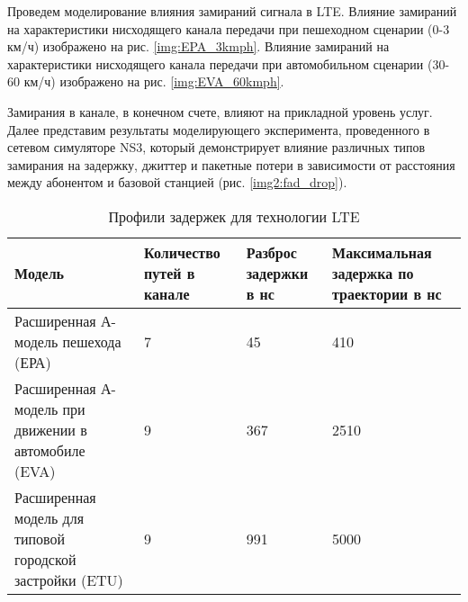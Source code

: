 Проведем моделирование влияния замираний сигнала в LTE. 
Влияние замираний на характеристики нисходящего канала передачи при пешеходном сценарии (0-3 км/ч) изображено на рис. \ref{img:EPA_3kmph}. 
Влияние замираний на характеристики нисходящего канала передачи при автомобильном сценарии (30-60 км/ч) изображено на рис. \ref{img:EVA_60kmph}.

Замирания в канале, в конечном счете, влияют на прикладной уровень услуг. 
Далее представим результаты моделирующего эксперимента, проведенного в сетевом симуляторе NS3, 
который демонстрирует влияние различных типов замирания на задержку, 
джиттер и пакетные потери в зависимости от расстояния между абонентом и базовой станцией (рис. \ref{img2:fad_drop}).




\begin{table} [htb]
  \centering
\parbox{15cm}{\caption{Профили задержек для технологии LTE}\label{ProfileDelay}}
    \begin{tabular}{|p{4cm}|p{3cm}|p{3cm}|p{4cm}|}
    \hline \hline
    Модель                                                            &  Количество путей в канале &  Разброс задержки в нс &  Максимальная задержка по траектории в нс \\ \hline \hline
    Расширенная А-модель пешехода (ЕРА)                               & 7                          & 45                     & 410                                       \\ \hline
    Расширенная А-модель при движении в автомобиле (EVA) & 9                          & 367                    & 2510                                      \\ \hline
    Расширенная модель для типовой городской застройки (ETU)          & 9                          & 991                    & 5000                                      \\ \hline
    \end{tabular}
\end{table}


